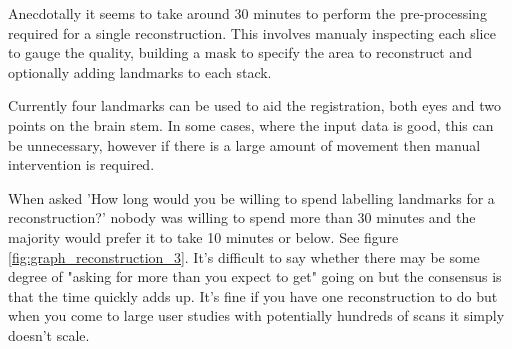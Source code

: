Anecdotally it seems to take around 30 minutes to perform the pre-processing required for a single reconstruction. This involves manualy inspecting each slice to gauge the quality, building a mask to specify the area to reconstruct and optionally adding landmarks to each stack.

Currently four landmarks can be used to aid the registration, both eyes and two points on the brain stem. In some cases, where the input data is good, this can be unnecessary, however if there is a large amount of movement then manual intervention is required.

When asked 'How long would you be willing to spend labelling landmarks for a reconstruction?' nobody was willing to spend more than 30 minutes and the majority would prefer it to take 10 minutes or below. See figure \ref{fig:graph_reconstruction_3}. It's difficult to say whether there may be some degree of "asking for more than you expect to get" going on but the consensus is that the time quickly adds up. It's fine if you have one reconstruction to do but when you come to large user studies with potentially hundreds of scans it simply doesn't scale.

